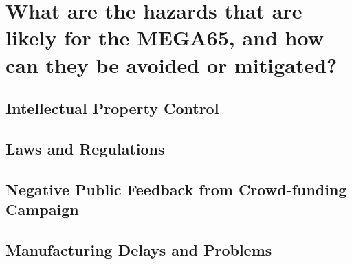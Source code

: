 
\chapter{What are the hazards that are likely for the MEGA65, and how can they be avoided or mitigated?}
\label{Chapter6}

\section{Intellectual Property Control}

\section{Laws and Regulations}

\section{Negative Public Feedback from Crowd-funding Campaign}

\section{Manufacturing Delays and Problems}


